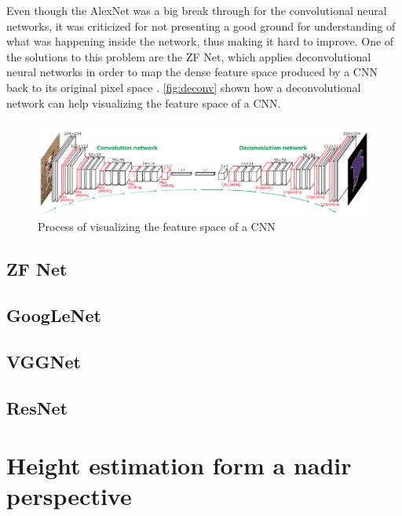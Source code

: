 Even though the AlexNet was a big break through for the convolutional neural networks, it was criticized for not presenting a good ground for understanding of what was happening inside the network, thus making it hard to improve. One of the solutions to this problem are the ZF Net, which applies deconvolutional neural networks \citep{Zeiler2011} in order to map the dense feature space produced by a CNN back to its original pixel space \citep{Zeiler2014}. \autoref{fig:deconv} shown how a deconvolutional network can help visualizing the feature space of a CNN.

\begin{figure}[!h]
	\centering
	\includegraphics[scale=0.5]{fig/deconv.png}
	\caption{Process of visualizing the feature space of a CNN \citep{Noh2015}}
	\label{fig:deconv}
\end{figure}



\subsection{ZF Net}
\subsection{GoogLeNet}
\subsection{VGGNet}
\subsection{ResNet}

\section{Height estimation form a nadir perspective}

